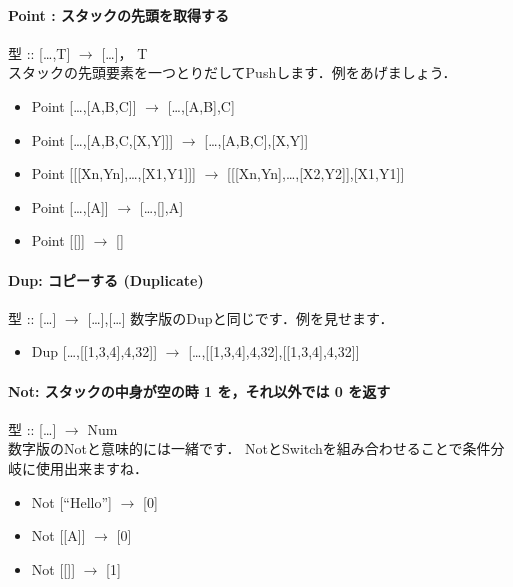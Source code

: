 \paragraph{Point : スタックの先頭を取得する}

型 :: {[}\ldots{},T{]} $\to$ {[}\ldots{}{]}，
T\\スタックの先頭要素を一つとりだしてPushします．例をあげましょう．

\begin{itemize}
\item
  Point {[}\ldots{},{[}A,B,C{]}{]} $\to$
  {[}\ldots{},{[}A,B{]},C{]}
\item
  Point {[}\ldots{},{[}A,B,C,{[}X,Y{]}{]}{]} $\to$
  {[}\ldots{},{[}A,B,C{]},{[}X,Y{]}{]}
\item
  Point {[}{[}{[}Xn,Yn{]},\ldots{},{[}X1,Y1{]}{]}{]} $\to$
  {[}{[}{[}Xn,Yn{]},\ldots{},{[}X2,Y2{]}{]},{[}X1,Y1{]}{]}
\item
  Point {[}\ldots{},{[}A{]}{]} $\to$ {[}\ldots{},{[}{]},A{]}
\item
  Point {[}{[}{]}{]} $\to$ {[}{]}
\end{itemize}

\paragraph{Dup: コピーする (Duplicate)}

型 :: {[}\ldots{}{]} $\to$ {[}\ldots{}{]},{[}\ldots{}{]}
数字版のDupと同じです．例を見せます．

\begin{itemize}
\item
  Dup {[}\ldots{},{[}{[}1,3,4{]},4,32{]}{]} $\to$
  {[}\ldots{},{[}{[}1,3,4{]},4,32{]},{[}{[}1,3,4{]},4,32{]}{]}
\end{itemize}

\paragraph{Not: スタックの中身が空の時 1 を，それ以外では 0 を返す}

型 :: {[}\ldots{}{]} $\to$
Num\\数字版のNotと意味的には一緒です．
NotとSwitchを組み合わせることで条件分岐に使用出来ますね．

\begin{itemize}
\item
  Not {[}``Hello''{]} $\to$ {[}0{]}
\item
  Not {[}{[}A{]}{]} $\to$ {[}0{]}
\item
  Not {[}{[}{]}{]} $\to$ {[}1{]}
\end{itemize}

